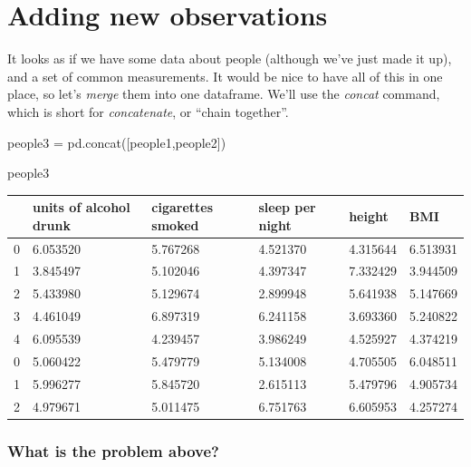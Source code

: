 \documentclass[
  letterpaper,
  DIV=11,
  numbers=noendperiod]{scrreprt}
\newenvironment{Shaded}{\begin{snugshade}}{\end{snugshade}}
\newcommand{\NormalTok}[1]{\textcolor[rgb]{0.00,0.23,0.31}{#1}}
\newcommand{\OperatorTok}[1]{\textcolor[rgb]{0.37,0.37,0.37}{#1}}
\begin{document}

\hypertarget{adding-new-observations}{%
\chapter{Adding new observations}\label{adding-new-observations}}

It looks as if we have some data about people (although we've just made
it up), and a set of common measurements. It would be nice to have all
of this in one place, so let's \emph{merge} them into one dataframe.
We'll use the \emph{concat} command, which is short for
\emph{concatenate}, or ``chain together''.

\begin{Shaded}
\begin{Highlighting}[]
\NormalTok{people3 }\OperatorTok{=}\NormalTok{ pd.concat([people1,people2])}
\end{Highlighting}
\end{Shaded}

\begin{Shaded}
\begin{Highlighting}[]
\NormalTok{people3}
\end{Highlighting}
\end{Shaded}

\begin{longtable}[]{@{}llllll@{}}
\toprule()
& units of alcohol drunk & cigarettes smoked & sleep per night & height
& BMI \\
\midrule()
\endhead
0 & 6.053520 & 5.767268 & 4.521370 & 4.315644 & 6.513931 \\
1 & 3.845497 & 5.102046 & 4.397347 & 7.332429 & 3.944509 \\
2 & 5.433980 & 5.129674 & 2.899948 & 5.641938 & 5.147669 \\
3 & 4.461049 & 6.897319 & 6.241158 & 3.693360 & 5.240822 \\
4 & 6.095539 & 4.239457 & 3.986249 & 4.525927 & 4.374219 \\
0 & 5.060422 & 5.479779 & 5.134008 & 4.705505 & 6.048511 \\
1 & 5.996277 & 5.845720 & 2.615113 & 5.479796 & 4.905734 \\
2 & 4.979671 & 5.011475 & 6.751763 & 6.605953 & 4.257274 \\
\bottomrule()
\end{longtable}

\hypertarget{what-is-the-problem-above}{%
\subsection{What is the problem
above?}\label{what-is-the-problem-above}}
\end{document}

